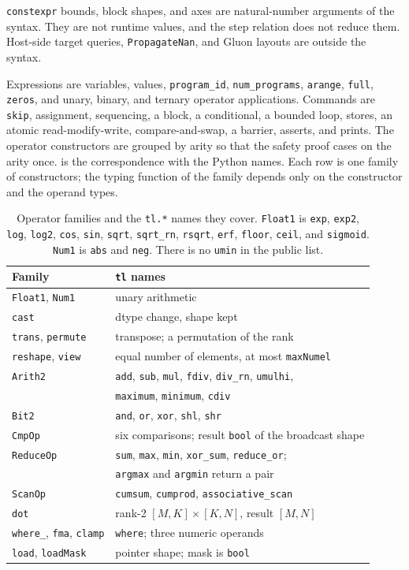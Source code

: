 \documentclass[a4paper,UKenglish,anonymous,cleveref,autoref]{lipics-v2021}
\begin{document}
\texttt{constexpr} bounds, block shapes, and axes are natural-number arguments of the syntax.
They are not runtime values, and the step relation does not reduce them.
Host-side target queries, \texttt{PropagateNan}, and Gluon layouts are outside the syntax.

Expressions are variables, values, \texttt{program\_id}, \texttt{num\_programs}, \texttt{arange}, \texttt{full}, \texttt{zeros}, and unary, binary, and ternary operator applications.
Commands are \texttt{skip}, assignment, sequencing, a block, a conditional, a bounded loop, stores, an atomic read-modify-write, compare-and-swap, a barrier, asserts, and prints.
The operator constructors are grouped by arity so that the safety proof cases on the arity once.
 is the correspondence with the Python names.
Each row is one family of constructors; the typing function of the family depends only on the constructor and the operand types.

\begin{table}[t]
\caption{Operator families and the \texttt{tl.*} names they cover.
\texttt{Float1} is \texttt{exp}, \texttt{exp2}, \texttt{log}, \texttt{log2}, \texttt{cos}, \texttt{sin}, \texttt{sqrt}, \texttt{sqrt\_rn}, \texttt{rsqrt}, \texttt{erf}, \texttt{floor}, \texttt{ceil}, and \texttt{sigmoid}.
\texttt{Num1} is \texttt{abs} and \texttt{neg}.
There is no \texttt{umin} in the public list.}
\label{tab:ops}
\begin{tabular}{@{}ll@{}}
\hline
Family & \texttt{tl} names \\
\hline
\texttt{Float1}, \texttt{Num1} & unary arithmetic \\
\texttt{cast} & dtype change, shape kept \\
\texttt{trans}, \texttt{permute} & transpose; a permutation of the rank \\
\texttt{reshape}, \texttt{view} & equal number of elements, at most \texttt{maxNumel} \\
\texttt{Arith2} & \texttt{add}, \texttt{sub}, \texttt{mul}, \texttt{fdiv}, \texttt{div\_rn}, \texttt{umulhi}, \\
& \texttt{maximum}, \texttt{minimum}, \texttt{cdiv} \\
\texttt{Bit2} & \texttt{and}, \texttt{or}, \texttt{xor}, \texttt{shl}, \texttt{shr} \\
\texttt{CmpOp} & six comparisons; result \texttt{bool} of the broadcast shape \\
\texttt{ReduceOp} & \texttt{sum}, \texttt{max}, \texttt{min}, \texttt{xor\_sum}, \texttt{reduce\_or}; \\
& \texttt{argmax} and \texttt{argmin} return a pair \\
\texttt{ScanOp} & \texttt{cumsum}, \texttt{cumprod}, \texttt{associative\_scan} \\
\texttt{dot} & rank-2 \([M,K]\times[K,N]\), result \([M,N]\) \\
\texttt{where\_}, \texttt{fma}, \texttt{clamp} & \texttt{where}; three numeric operands \\
\texttt{load}, \texttt{loadMask} & pointer shape; mask is \texttt{bool} \\
\hline
\end{tabular}
\end{table}
\end{document}
